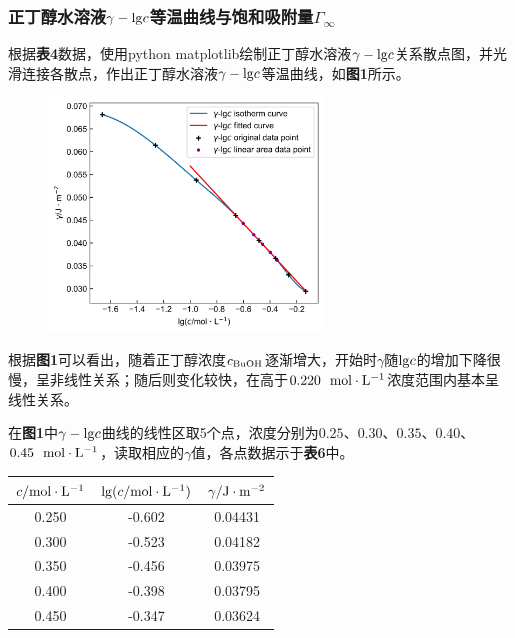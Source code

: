 \documentclass[12pt]{article}
\begin{document}
\subsubsection{正丁醇水溶液$\gamma-{\rm lg}c$等温曲线与饱和吸附量$\Gamma_{\infty}$}
根据\textbf{表4}数据，使用python matplotlib绘制正丁醇水溶液$\gamma-{\rm lg}c$关系散点图，并光滑连接各散点，作出正丁醇水溶液$\gamma-{\rm lg}c$等温曲线，如\textbf{图1}所示。
\begin{figure}[h]
	\centering
	\includegraphics[width=0.65\textwidth]{1.jpg}
\end{figure}
\par
根据\textbf{图1}可以看出，随着正丁醇浓度$c_{\rm BuOH}$逐渐增大，开始时$\gamma$随${\rm lg}c$的增加下降很慢，呈非线性关系；随后则变化较快，在高于$0.220\ \ {\rm mol\cdot L^{-1}}$浓度范围内基本呈线性关系。\par 
\vbox{}
\vbox{}
在\textbf{图1}中$\gamma-{\rm lg}c$曲线的线性区取5个点，浓度分别为$0.25$、$0.30$、$0.35$、$0.40$、$0.45\ \ {\rm mol\cdot L^{-1}}$，读取相应的$\gamma$值，各点数据示于\textbf{表6}中。
\begin{table}[h]
	\centering
	\begin{tabular}{ccc}
		\toprule
		$c/{\rm mol\cdot L^{-1}}$ & ${\rm lg}(c/{\rm mol\cdot L^{-1}})$& $\gamma/{\rm J\cdot m^{-2}}$\\
		\midrule
		0.250 & -0.602 & 0.04431 \\
		0.300 & -0.523 & 0.04182\\
		0.350 & -0.456 & 0.03975\\
		0.400 & -0.398 & 0.03795\\
		0.450 & -0.347 & 0.03624\\
		\bottomrule
	\end{tabular}
\end{table}
\end{document}
